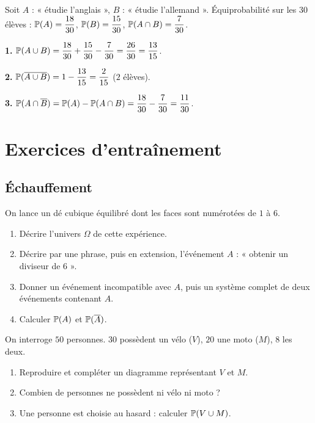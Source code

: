Soit $A$ : « étudie l'anglais », $B$ : « étudie l'allemand ». Équiprobabilité
sur les $30$ élèves : $\mathbb{P}(A)=\dfrac{18}{30}$, $\mathbb{P}(B)=\dfrac{15}{30}$,
$\mathbb{P}(A\cap B)=\dfrac{7}{30}$.

\textbf{1.} $\mathbb{P}(A\cup B)=\dfrac{18}{30}+\dfrac{15}{30}-\dfrac{7}{30}
=\dfrac{26}{30}=\dfrac{13}{15}$.

\textbf{2.} $\mathbb{P}(\overline{A\cup B})=1-\dfrac{13}{15}=\dfrac{2}{15}$
($2$ élèves).

\textbf{3.} $\mathbb{P}(A\cap\overline{B})=\mathbb{P}(A)-\mathbb{P}(A\cap B)
=\dfrac{18}{30}-\dfrac{7}{30}=\dfrac{11}{30}$.


\section{Exercices d'entraînement}

\subsection{Échauffement}

On lance un dé cubique équilibré dont les faces sont numérotées de $1$ à $6$.
\begin{enumerate}
	\item Décrire l'univers $\Omega$ de cette expérience.
	\item Décrire par une phrase, puis en extension, l'événement $A$ :
	« obtenir un diviseur de $6$ ».
	\item Donner un événement incompatible avec $A$, puis un système complet
	de deux événements contenant $A$.
	\item Calculer $\mathbb{P}(A)$ et $\mathbb{P}(\overline{A})$.
\end{enumerate}

On interroge $50$ personnes. $30$ possèdent un vélo ($V$), $20$ une moto
($M$), $8$ les deux.
\begin{enumerate}
	\item Reproduire et compléter un diagramme représentant $V$ et $M$.
	\item Combien de personnes ne possèdent ni vélo ni moto ?
	\item Une personne est choisie au hasard : calculer $\mathbb{P}(V\cup M)$.
\end{enumerate}

